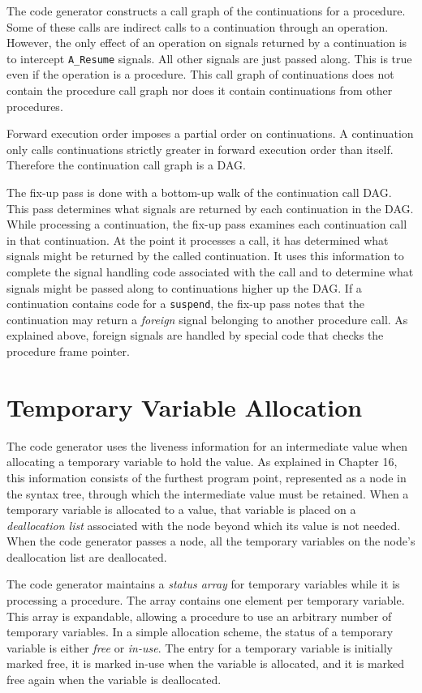 The code generator constructs a call graph of the continuations for a
procedure. Some of these calls are indirect calls to a continuation
through an operation. However, the only effect of an operation on
signals returned by a continuation is to intercept \texttt{A\_Resume}
signals. All other signals are just passed along. This is true even if
the operation is a procedure. This call graph of continuations does
not contain the procedure call graph nor does it contain continuations
from other procedures.

Forward execution order imposes a partial order on continuations. A
continuation only calls continuations strictly greater in forward
execution order than itself. Therefore the continuation call graph is
a DAG.

The fix-up pass is done with a bottom-up walk of the continuation call
DAG. This pass determines what signals are returned by each
continuation in the DAG. While processing a continuation, the fix-up
pass examines each continuation call in that continuation. At the
point it processes a call, it has determined what signals might be
returned by the called continuation. It uses this information to
complete the signal handling code associated with the call and to
determine what signals might be passed along to continuations higher
up the DAG. If a continuation contains code for a \texttt{suspend}, the fix-up
pass notes that the continuation may return a \textit{foreign} signal
belonging to another procedure call. As explained above, foreign
signals are handled by special code that checks the procedure frame
pointer.


\section{Temporary Variable Allocation}

The code generator uses the liveness information for an intermediate
value when allocating a temporary variable to hold the value. As
explained in Chapter 16, this information consists of the furthest
program point, represented as a node in the syntax tree, through which
the intermediate value must be retained. When a temporary variable is
allocated to a value, that variable is placed on a
\textit{deallocation list} associated with the node beyond which its
value is not needed. When the code generator passes a node, all the
temporary variables on the node's deallocation list are deallocated.

The code generator maintains a \textit{status array} for temporary
variables while it is processing a procedure. The array contains one
element per temporary variable. This array is expandable, allowing a
procedure to use an arbitrary number of temporary variables. In a
simple allocation scheme, the status of a temporary variable is either
\textit{free} or \textit{in-use}. The entry for a temporary variable
is initially marked free, it is marked in-use when the variable is
allocated, and it is marked free again when the variable is
deallocated.

